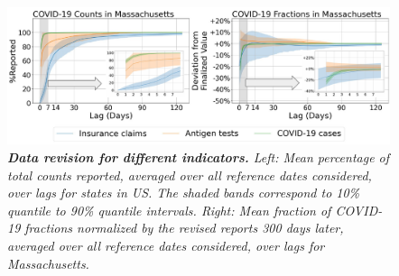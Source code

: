 \begin{figure}[h!]
    \centering
    \includegraphics[width=\textwidth]{figs/Intro_fig.pdf}
    \caption{\textit{\textbf{Data revision for different indicators.} Left: Mean percentage of total counts reported, averaged over all reference dates considered, over lags for states in US. The shaded bands correspond to 10\% quantile to 90\% quantile intervals. Right: Mean fraction of COVID-19 fractions normalized by the revised reports 300 days later, averaged over all reference dates considered, over lags for Massachusetts.}}
\end{figure}



